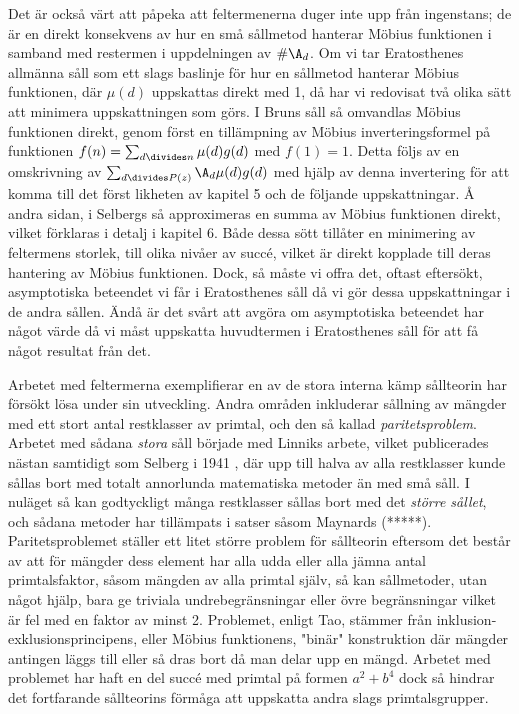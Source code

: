 Det är också värt att påpeka att feltermenerna duger inte upp från ingenstans; de är en direkt konsekvens av hur en små sållmetod hanterar Möbius funktionen i samband med restermen i uppdelningen av \(\#\A_d\).
Om vi tar Eratosthenes allmänna såll som ett slags baslinje för hur en sållmetod hanterar Möbius funktionen, där \(\mu(d)\) uppskattas direkt med 1, då har vi redovisat två olika sätt att minimera uppskattningen som görs. 
I Bruns såll så omvandlas Möbius funktionen direkt, genom först en tillämpning av Möbius inverteringsformel på funktionen \(f(n) = \sum_{d\divides n}\mu(d)g(d)\) med \(f(1) = 1\). 
Detta följs av en omskrivning av \(\sum_{d\divides P(z)}\A_d \mu(d) g(d)\) med hjälp av denna invertering för att komma till det först likheten av kapitel 5 och de följande uppskattningar. 
Å andra sidan, i Selbergs så approximeras en summa av Möbius funktionen direkt, vilket förklaras i detalj i kapitel 6.
Både dessa sött tillåter en minimering av feltermens storlek, till olika nivåer av succé, vilket är direkt kopplade till deras hantering av Möbius funktionen.
Dock, så måste vi offra det, oftast eftersökt, asymptotiska beteendet vi får i Eratosthenes såll då vi gör dessa uppskattningar i de andra sållen.
Ändå är det svårt att avgöra om asymptotiska beteendet har något värde då vi måst uppskatta huvudtermen i Eratosthenes såll för att få något resultat från det.



Arbetet med feltermerna exemplifierar en av de stora interna kämp sållteorin har försökt lösa under sin utveckling.
Andra områden inkluderar sållning av mängder med ett stort antal restklasser av primtal, och den så kallad \textit{paritetsproblem}. Arbetet med sådana \textit{stora} såll började med Linniks arbete, vilket publicerades nästan samtidigt som Selberg i 1941 \cite[s. 135]{cojocarumurty}, där upp till halva av alla restklasser kunde sållas bort med totalt annorlunda matematiska metoder än med små såll. 
I nuläget så kan godtyckligt många restklasser sållas bort med det \textit{större sållet}, och sådana metoder har tillämpats i satser såsom Maynards \cite{mayBound}(*****).
Paritetsproblemet ställer ett litet större problem för sållteorin eftersom det består av att för mängder dess element har alla udda eller alla jämna antal primtalsfaktor, såsom mängden av alla primtal själv, så kan sållmetoder, utan något hjälp, bara ge triviala undrebegränsningar eller övre begränsningar vilket är fel med en faktor av minst 2.
Problemet, enligt Tao, stämmer från inklusion-exklusionsprincipens, eller Möbius funktionens, "binär" konstruktion där mängder antingen läggs till eller så dras bort då man delar upp en mängd.
Arbetet med problemet har haft en del succé med primtal på formen \(a^2 + b^4\) \cite{abPrimes} dock så hindrar det fortfarande sållteorins förmåga att uppskatta andra slags primtalsgrupper.